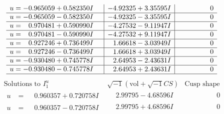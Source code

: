 \documentclass[1p]{elsarticle_modified}
\theoremstyle{definition}
\newcommand{\I}{\sqrt{-1}}
\begin{document}
$$\begin{array}{c|c|c}
\begin{aligned}
u &= -0.965059 + 0.582350 I\end{aligned}
 & -4.92325 + 3.35595 I & \phantom{-0.000000 } 0 \\ \hline\begin{aligned}
u &= -0.965059 - 0.582350 I\end{aligned}
 & -4.92325 - 3.35595 I & \phantom{-0.000000 } 0 \\ \hline\begin{aligned}
u &= \phantom{-}0.970481 + 0.590990 I\end{aligned}
 & -4.27532 - 9.11947 I & \phantom{-0.000000 } 0 \\ \hline\begin{aligned}
u &= \phantom{-}0.970481 - 0.590990 I\end{aligned}
 & -4.27532 + 9.11947 I & \phantom{-0.000000 } 0 \\ \hline\begin{aligned}
u &= \phantom{-}0.927246 + 0.736499 I\end{aligned}
 & \phantom{-}1.66618 - 3.03949 I & \phantom{-0.000000 } 0 \\ \hline\begin{aligned}
u &= \phantom{-}0.927246 - 0.736499 I\end{aligned}
 & \phantom{-}1.66618 + 3.03949 I & \phantom{-0.000000 } 0 \\ \hline\begin{aligned}
u &= -0.930480 + 0.745778 I\end{aligned}
 & \phantom{-}2.64953 - 2.43631 I & \phantom{-0.000000 } 0 \\ \hline\begin{aligned}
u &= -0.930480 - 0.745778 I\end{aligned}
 & \phantom{-}2.64953 + 2.43631 I & \phantom{-0.000000 } 0\\
 \hline 
 \end{array}$$\newpage$$\begin{array}{c|c|c}  
\text{Solutions to }I^u_{1}& \I (\text{vol} + \sqrt{-1}CS) & \text{Cusp shape}\\
 \hline 
\begin{aligned}
u &= \phantom{-}0.960357 + 0.720758 I\end{aligned}
 & \phantom{-}2.99795 - 4.68596 I & \phantom{-0.000000 } 0 \\ \hline\begin{aligned}
u &= \phantom{-}0.960357 - 0.720758 I\end{aligned}
 & \phantom{-}2.99795 + 4.68596 I & \phantom{-0.000000 } 0 \\ \hline\begin{aligned}

\end{aligned}
\end{array}$$
\end{document}
